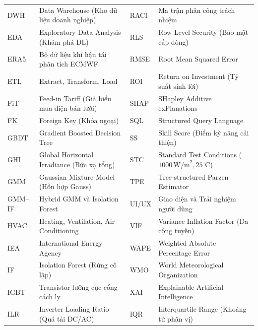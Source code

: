 \documentclass[12pt, a4paper]{report}
\begin{document}
\begin{table}[H]
\begin{tabularx}{\textwidth}{@{} l >{\raggedright\arraybackslash}X @{\hspace{10pt}} l >{\raggedright\arraybackslash}X @{}}
DWH       & Data Warehouse (Kho dữ liệu doanh nghiệp)  & RACI      & Ma trận phân công trách nhiệm \\
EDA       & Exploratory Data Analysis (Khám phá DL)    & RLS       & Row-Level Security (Bảo mật cấp dòng) \\
ERA5      & Bộ dữ liệu khí hậu tái phân tích ECMWF     & RMSE      & Root Mean Squared Error \\
ETL       & Extract, Transform, Load                   & ROI       & Return on Investment (Tỷ suất sinh lời) \\
FiT       & Feed-in Tariff (Giá biểu mua điện bán lưới)& SHAP      & SHapley Additive exPlanations \\
FK        & Foreign Key (Khóa ngoại)                   & SQL       & Structured Query Language \\
GBDT      & Gradient Boosted Decision Tree             & SS        & Skill Score (Điểm kỹ năng cải thiện) \\
GHI       & Global Horizontal Irradiance (Bức xạ tổng) & STC       & Standard Test Conditions ($1000\,\text{W/m}^2, 25^\circ\text{C}$) \\
GMM       & Gaussian Mixture Model (Hỗn hợp Gauss)     & TPE       & Tree-structured Parzen Estimator \\
GMM--IF   & Hybrid GMM và Isolation Forest             & UI/UX     & Giao diện và Trải nghiệm người dùng \\
HVAC      & Heating, Ventilation, Air Conditioning     & VIF       & Variance Inflation Factor (Đa cộng tuyến) \\
IEA       & International Energy Agency                & WAPE      & Weighted Absolute Percentage Error \\
IF        & Isolation Forest (Rừng cô lập)             & WMO       & World Meteorological Organization \\
IGBT      & Transistor lưỡng cực cổng cách ly          & XAI       & Explainable Artificial Intelligence \\
ILR       & Inverter Loading Ratio (Quá tải DC/AC)     & IQR       & Interquartile Range (Khoảng tứ phân vị) \\
\bottomrule
\end{tabularx}
\end{table}

\newpage
\pagestyle{main}

\end{document}
